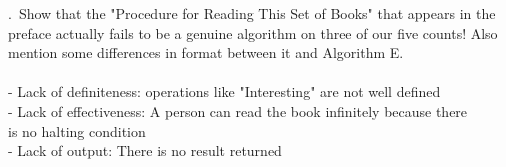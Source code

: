 \documentclass[12pt]{article}
\begin{document}
.\
Show that the "Procedure for Reading This Set of Books" that appears in
the preface actually fails to be a genuine algorithm on three of our
five counts! Also mention some differences in format between
it and Algorithm E.\\\\
- Lack of definiteness: operations like "Interesting" are not well defined\\
- Lack of effectiveness: A person can read the book infinitely because there\\
is no halting condition\\
- Lack of output: There is no result returned
\end{document}
